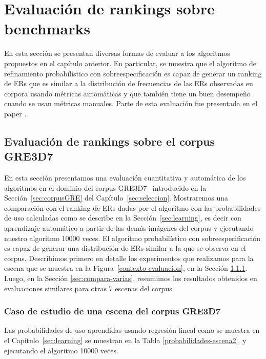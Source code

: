 \chapter{Evaluaci\'on de rankings sobre benchmarks}
\label{sec:evaluacion}

En esta secci\'on se presentan diversas formas de evaluar a los algoritmos propuestos en el cap\'itulo anterior. En particular, se muestra que el algoritmo de refinamiento probabil\'{i}stico con sobreespecificaci\'on es capaz de generar un ranking de ERs que es similar a la distribuci\'on de frecuencias de las ERs observadas en corpora usando m\'etricas autom\'aticas y que tambi\'en tiene un buen desempe\~no cuando se usan m\'etricas manuales. Parte de esta evaluaci\'on fue presentada en el paper \cite{context2013}. 

\section{Evaluaci\'on de rankings sobre el corpus GRE3D7}
\label{sec:compara}
En esta secci\'on presentamos una evaluaci\'on cuantitativa y autom\'atica de los algoritmos en el dominio del corpus GRE3D7~\cite{gre3d7} introducido en la Secci\'on~\ref{sec:corpusGRE} del Cap\'itulo~\ref{sec:seleccion}. Mostraremos una comparaci\'on con el ranking de ERs dadas por el algoritmo con las probabilidades de uso calculadas como se describe en la Secci\'on~\ref{sec:learning}, es decir con aprendizaje autom\'atico a partir de las dem\'as im\'agenes del corpus y ejecutando nuestro algoritmo 10000 veces. El algoritmo probabil\'istico con sobreespecificaci\'on es capaz de generar una distribuci\'on de ERs similar a la que se observa en el corpus. Describimos primero en detalle los experimentos que realizamos para la escena que se muestra en la Figura~\ref{contexto-evaluacion}, en la Secci\'on \ref{sec:caso_estudio_gre3d7}. Luego, en la Secci\'on \ref{sec:compara-varias}, resumimos los resultados obtenidos en evaluaciones similares para otras 7 escenas del corpus. 
\subsection{Caso de estudio de una escena del corpus GRE3D7}
\label{sec:caso_estudio_gre3d7}
Las probabilidades de uso aprendidas usando regresi\'on lineal como se muestra en el Cap\'itulo~\ref{sec:learning} se muestran en la Tabla \ref{probabilidades-escena2}, y ejecutando el algoritmo 10000 veces.

